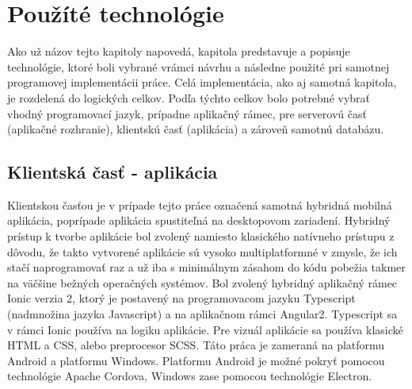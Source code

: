 \chapter{Použíté technológie}
\label{chap:pouzite-techologie}
Ako už názov tejto kapitoly napovedá, kapitola predstavuje a popisuje technológie, ktoré boli vybrané vrámci návrhu a následne použité pri samotnej programovej implementácii práce. Celá implementácia, ako aj samotná kapitola, je rozdelená do logických celkov. Podľa týchto celkov bolo potrebné vybrať vhodný programovací jazyk, prípadne aplikačný rámec, pre serverovú časť (aplikačné rozhranie), klientskú časť (aplikácia) a zároveň samotnú databázu.

\section{Klientská časť - aplikácia}
Klientskou časťou je v prípade tejto práce označená samotná hybridná mobilná aplikácia, poprípade aplikácia spustiteľná na desktopovom zariadení. Hybridný prístup k tvorbe aplikácie bol zvolený namiesto klasického natívneho prístupu z dôvodu, že takto vytvorené aplikácie sú vysoko multiplatformné v zmysle, že ich stačí naprogramovať raz a už iba s minimálnym zásahom do kódu pobežia takmer na väčšine bežných operačných systémov. Bol zvolený hybridný aplikačný rámec Ionic verzia 2, ktorý je postavený na programovacom jazyku Typescript (nadmnožina jazyka Javascript) a na aplikačnom rámci Angular2. Typescript sa v rámci Ionic používa na logiku aplikácie. Pre vizuál aplikácie sa používa klasické HTML a CSS, alebo preprocesor SCSS. Táto práca je zameraná na  platformu Android a platformu Windows. Platformu Android je možné pokryť pomocou technológie Apache Cordova, Windows zase pomocou technológie Electron. 
